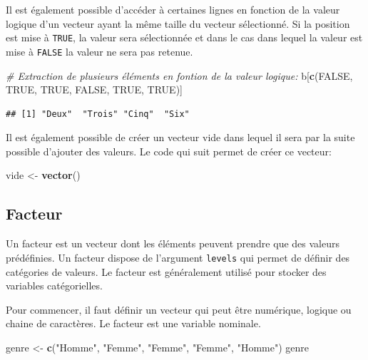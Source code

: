 \documentclass[
]{book}
\newenvironment{Shaded}{\begin{snugshade}}{\end{snugshade}}
\newcommand{\CommentTok}[1]{\textcolor[rgb]{0.56,0.35,0.01}{\textit{#1}}}
\newcommand{\ConstantTok}[1]{\textcolor[rgb]{0.56,0.35,0.01}{#1}}
\newcommand{\FunctionTok}[1]{\textcolor[rgb]{0.13,0.29,0.53}{\textbf{#1}}}
\newcommand{\NormalTok}[1]{#1}
\newcommand{\OtherTok}[1]{\textcolor[rgb]{0.56,0.35,0.01}{#1}}
\newcommand{\StringTok}[1]{\textcolor[rgb]{0.31,0.60,0.02}{#1}}
\begin{document}
Il est également possible d'accéder à certaines lignes en fonction de la valeur logique d'un vecteur ayant la même taille du vecteur sélectionné. Si la position est mise à \texttt{TRUE}, la valeur sera sélectionnée et dans le cas dans lequel la valeur est mise à \texttt{FALSE} la valeur ne sera pas retenue.

\begin{Shaded}
\begin{Highlighting}[]
\CommentTok{\# Extraction de plusieurs éléments en fontion de la valeur logique:}
\NormalTok{b[}\FunctionTok{c}\NormalTok{(}\ConstantTok{FALSE}\NormalTok{, }\ConstantTok{TRUE}\NormalTok{, }\ConstantTok{TRUE}\NormalTok{, }\ConstantTok{FALSE}\NormalTok{, }\ConstantTok{TRUE}\NormalTok{, }\ConstantTok{TRUE}\NormalTok{)]}
\end{Highlighting}
\end{Shaded}

\begin{verbatim}
## [1] "Deux"  "Trois" "Cinq"  "Six"
\end{verbatim}

Il est également possible de créer un vecteur vide dans lequel il sera par la suite possible d'ajouter des valeurs. Le code qui suit permet de créer ce vecteur:

\begin{Shaded}
\begin{Highlighting}[]
\NormalTok{vide }\OtherTok{\textless{}{-}} \FunctionTok{vector}\NormalTok{()}
\end{Highlighting}
\end{Shaded}

\subsection{Facteur}\label{facteur}

Un facteur est un vecteur dont les éléments peuvent prendre que des valeurs prédéfinies. Un facteur dispose de l'argument \texttt{levels} qui permet de définir des catégories de valeurs. Le facteur est généralement utilisé pour stocker des variables catégorielles.

Pour commencer, il faut définir un vecteur qui peut être numérique, logique ou chaine de caractères. Le facteur est une variable nominale.

\begin{Shaded}
\begin{Highlighting}[]
\NormalTok{genre }\OtherTok{\textless{}{-}} \FunctionTok{c}\NormalTok{(}\StringTok{"Homme"}\NormalTok{, }\StringTok{"Femme"}\NormalTok{, }\StringTok{"Femme"}\NormalTok{, }\StringTok{"Femme"}\NormalTok{, }\StringTok{"Homme"}\NormalTok{)}
\NormalTok{genre}
\end{Highlighting}
\end{Shaded}
\end{document}
